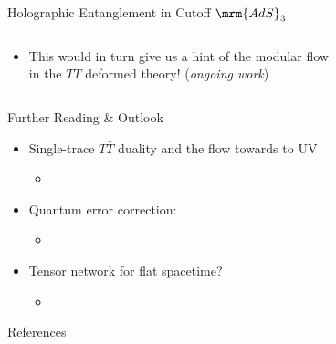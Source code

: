 \documentclass[aspectratio=169,10pt
	,noamsthm
]{beamer}
\begin{document}
\begin{frame}{Holographic Entanglement in Cutoff $\mrm{AdS}_3$}{%
	\textcite{Lewkowycz:2019xse}%
}
\begin{columns}
\begin{column}{.65\textwidth}
\begin{itemize}
\begin{itemize}
			\item This would in turn give us a hint of the modular flow\\
			 in the $T\bar{T}$ deformed theory! (\textit{ongoing work})
			
			\end{itemize}
		
		\end{itemize}
	\end{column}
	\end{columns}
\end{frame}


\begin{frame}{Further Reading \& Outlook}
	\begin{itemize}
	\item Single-trace $T\bar{T}$ duality and the flow towards to UV
		\begin{itemize}
		\item {}
		\end{itemize}
	\item Quantum error correction:
		\begin{itemize}
		\item {}
		\end{itemize}
	\item Tensor network for flat spacetime?
		\begin{itemize}
		\item {}
		\end{itemize}
	\end{itemize}
\end{frame}


\begin{frame}[allowframebreaks]{References}
\renewcommand*{\bibfont}{\footnotesize}
\printbibliography[%
	,heading = bibintoc
]
\end{frame}
\end{document}
